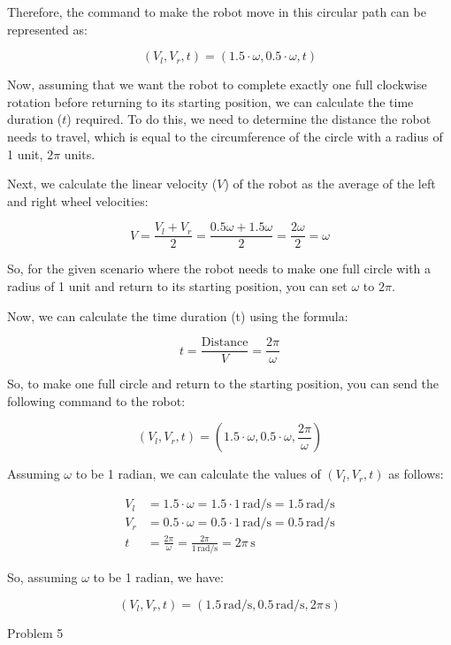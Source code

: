 \documentclass[answers]{exam}
\begin{document}
\begin{questions}
\begin{parts}
\begin{solution}
            Therefore, the command to make the robot move in this circular path can be represented as:

            \[(V_l, V_r, t) = (1.5\cdot\omega, 0.5\cdot\omega, t)\]

            Now, assuming that we want the robot to complete exactly one full clockwise rotation before returning to its starting position, we can calculate the time duration (\(t\)) required. To do this, we need to determine the distance the robot needs to travel, which is equal to the circumference of the circle with a radius of 1 unit, \(2\pi\) units.

            Next, we calculate the linear velocity (\(V\)) of the robot as the average of the left and right wheel velocities:

            \[V = \frac{V_l + V_r}{2} = \frac{0.5\omega + 1.5\omega}{2} = \frac{2\omega}{2} = \omega\]

            So, for the given scenario where the robot needs to make one full circle with a radius of 1 unit and return to its starting position, you can set \(\omega\) to \(2\pi\).

            Now, we can calculate the time duration (t) using the formula:

            \[t = \frac{\text{Distance}}{V} = \frac{2\pi}{\omega}\]

            So, to make one full circle and return to the starting position, you can send the following command to the robot:

            \[(V_l, V_r, t) = (1.5\cdot\omega, 0.5\cdot\omega, \frac{2\pi}{\omega})\]

            Assuming \(\omega\) to be 1 radian, we can calculate the values of \((V_l, V_r, t)\) as follows:

            \begin{align*}
                V_l &= 1.5 \cdot \omega = 1.5 \cdot 1 \, \text{rad/s} = 1.5 \, \text{rad/s} \\
                V_r &= 0.5 \cdot \omega = 0.5 \cdot 1 \, \text{rad/s} = 0.5 \, \text{rad/s} \\
                t &= \frac{2\pi}{\omega} = \frac{2\pi}{1 \, \text{rad/s}} = 2\pi \, \text{s}
            \end{align*}

            So, assuming \(\omega\) to be 1 radian, we have:

            \[
            (V_l, V_r, t) = (1.5 \, \text{rad/s}, 0.5 \, \text{rad/s}, 2\pi \, \text{s})
            \]
        \end{solution}
    \end{parts}
    \question Problem 5

\end{questions}
\end{document}
